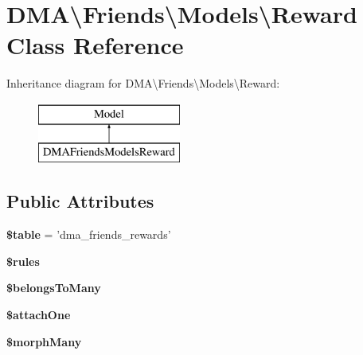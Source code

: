 \hypertarget{classDMA_1_1Friends_1_1Models_1_1Reward}{\section{D\+M\+A\textbackslash{}Friends\textbackslash{}Models\textbackslash{}Reward Class Reference}
\label{classDMA_1_1Friends_1_1Models_1_1Reward}
}
Inheritance diagram for D\+M\+A\textbackslash{}Friends\textbackslash{}Models\textbackslash{}Reward\+:\begin{figure}[H]
\begin{center}
\leavevmode
\includegraphics[height=2.000000cm]{d7/dc4/classDMA_1_1Friends_1_1Models_1_1Reward}
\end{center}
\end{figure}
\subsection*{Public Attributes}
\begin{DoxyCompactItemize}
\item 
\hypertarget{classDMA_1_1Friends_1_1Models_1_1Reward_a99affaf28976dda4adc97dfe06a6c000}{{\bfseries \$table} = 'dma\+\_\+friends\+\_\+rewards'}\label{classDMA_1_1Friends_1_1Models_1_1Reward_a99affaf28976dda4adc97dfe06a6c000}

\item 
{\bfseries \$rules}
\item 
{\bfseries \$belongs\+To\+Many}
\item 
{\bfseries \$attach\+One}
\item 
{\bfseries \$morph\+Many}
\end{DoxyCompactItemize}
